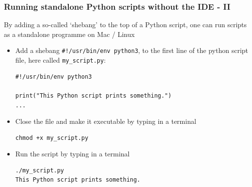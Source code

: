 \documentclass[xcolor=table]{beamer}
\begin{document}
\begin{frame}[fragile]
\frametitle{Running standalone Python scripts without the IDE - II}
By adding a so-called `shebang' to the top of a Python script, one 
can run scripts as a standalone programme on Mac / Linux \vspace{3pt}
   \pause 
\begin{itemize}\addtolength{\itemsep}{0.05\baselineskip}
    \item Add a shebang \texttt{\#!/usr/bin/env python3}, to the first line of the python script file, here called \texttt{my\_script.py}:
\begin{lstlisting}[style=python]
#!/usr/bin/env python3

print("This Python script prints something.")
...
\end{lstlisting}
    \pause 
    \item Close the file and make it executable by typing in a terminal
\begin{lstlisting}[style=bash]
chmod +x my_script.py
\end{lstlisting}
    \pause 
    \item Run the script by typing in a terminal
\begin{lstlisting}[style=bash]
./my_script.py
This Python script prints something.
\end{lstlisting}
\end{itemize}

\end{frame}
\end{document}
